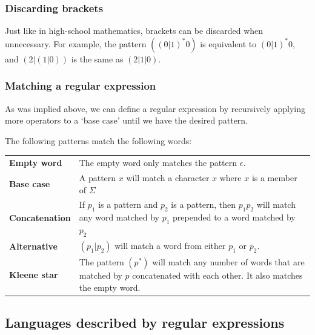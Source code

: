 
\subsubsection{Discarding brackets}

Just like in high-school mathematics, brackets can be discarded when
unnecessary. For example, the pattern $((0|1)^*0)$ is equivalent to $(0|1)^*0$,
and $(2|(1|0))$ is the same as $(2|1|0)$.

\subsubsection{Matching a regular expression}

As was implied above, we can define a regular expression by recursively
applying more operators to a `base case' until we have the desired pattern.

The following patterns match the following words:

\begin{center}
  \begin{tabularx}{\textwidth}{>{\bfseries} l X}
    Empty word    & The empty word only matches the pattern $\epsilon$.\\
    Base case     & A pattern $x$ will match a character $x$ where $x$ is
              a member of $\Sigma$\\
    Concatenation   & If $p_1$ is a pattern and $p_2$ is a pattern, then
              $p_1p_2$ will match any word matched by $p_1$
              prepended to a word matched by $p_2$\\
    Alternative   & $(p_1|p_2)$ will match a word from either $p_1$ or 
              $p_2$.\\
    Kleene star   & The pattern $(p^*)$ will match any number of words
              that are matched by $p$ concatenated with each other.
              It also matches the empty word.\\
  \end{tabularx}
\end{center}

\subsection{Languages described by regular expressions}

